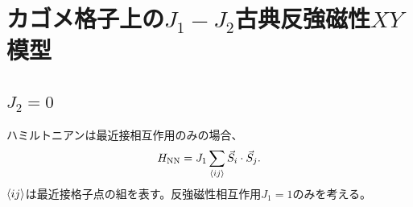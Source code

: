 \documentclass[12pt,titlepage,dvipdfmx]{jarticle}
\begin{document}
%
%
%
%
%
\newpage

\section{カゴメ格子上の$J_1-J_2$古典反強磁性$XY$模型}
\subsection{$J_2=0$}
ハミルトニアンは最近接相互作用のみの場合、
\begin{align}
   H_{\mathrm{NN}} = J_1\sum_{\ev{ij}}\vec{S}_i\cdot\vec{S}_j .
\end{align}
$\ev{ij}$は最近接格子点の組を表す。反強磁性相互作用$J_1=1$のみを考える。
\end{document}

